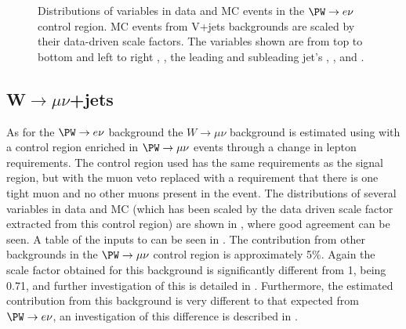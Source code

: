 \begin{figure}
  \caption{Distributions of variables in data and \ac{MC} events in the $\PW\rightarrow e\nu$ control region. \ac{MC} events from V+jets backgrounds are scaled by their data-driven scale factors. The variables shown are from top to bottom and left to right \detajj, \Mjj, the leading and subleading jet's \pt, \METnoMU, \METsig and \jetmetdphi.}
  \label{fig:parkedwenu}
\end{figure}

\subsection{W$\rightarrow \mu\nu$+jets}
\label{sec:parkedwmunu}
As for the $\PW\rightarrow e\nu$ background the $W\rightarrow \mu\nu$ background is estimated using  with a control region enriched in $\PW\rightarrow\mu\nu$ events through a change in lepton requirements. The control region used has the same requirements as the signal region, but with the muon veto replaced with a requirement that there is one tight muon and no other muons present in the event. The distributions of several variables in data and \ac{MC} (which has been scaled by the data driven scale factor extracted from this control region) are shown in , where good agreement can be seen. A table of the inputs to  can be seen in . The contribution from other backgrounds in the $\PW\rightarrow\mu\nu$ control region is approximately 5\%. Again the scale factor obtained  for this background is significantly different from 1, being 0.71, and further investigation of this is detailed in . Furthermore, the estimated contribution from this background is very different to that expected from $\PW\rightarrow e\nu$, an investigation of this difference is described in .

